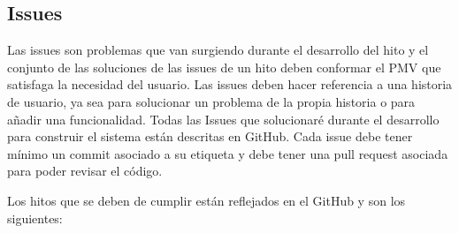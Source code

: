 \subsection{Issues}
Las issues son problemas que van surgiendo durante el desarrollo del hito y
el conjunto de las soluciones de las issues de un hito deben conformar el PMV que satisfaga la necesidad del usuario.
Las issues deben hacer referencia a una historia de usuario, ya sea para solucionar un problema de la propia historia o para añadir una funcionalidad.
Todas las Issues que solucionaré durante el desarrollo para construir el sistema están descritas en GitHub. Cada issue debe tener mínimo un commit asociado a su
etiqueta y debe tener una pull request asociada para poder revisar el código.

\begin{figure}[!tb]
    \begin{center}
        \label{Figura-Ciudades}
    \end{center}
\end{figure}


Los hitos que se deben de cumplir están reflejados en el GitHub y son los siguientes:

